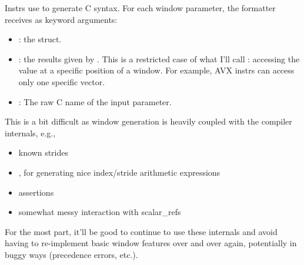 

\filbreak
Instrs use  to generate C syntax.
For each window parameter, the formatter receives as keyword arguments:
\begin{itemize}
  \item {}: the  struct.
  \filbreak
  \item {}: the results given by .
    This is a restricted case of what I'll call : accessing the value at a specific position of a window.
    For example, AVX instrs can access only one specific  vector.
  \filbreak
  \item {}: The raw C name of the input parameter.
\end{itemize}

\filbreak
{}

This is a bit difficult as window generation is heavily coupled with the compiler internals, e.g.,

\begin{itemize}
  \item known strides
  \filbreak
  \item {}, for generating nice index/stride arithmetic expressions
  \filbreak
  \item assertions
  \filbreak
  \item somewhat messy interaction with scalar\_refs
\end{itemize}

\filbreak
For the most part, it'll be good to continue to use these internals and avoid having to re-implement basic window features over and over again, potentially in buggy ways (precedence errors, etc.).

